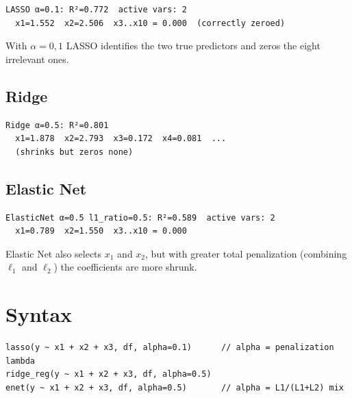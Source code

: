 \begin{lstlisting}[language={}, basicstyle=\ttfamily\small,
  frame=none, numbers=none, backgroundcolor=\color{codbg},
  xleftmargin=0pt, xrightmargin=0pt, breaklines=false]
LASSO α=0.1: R²=0.772  active vars: 2
  x1=1.552  x2=2.506  x3..x10 = 0.000  (correctly zeroed)
\end{lstlisting}

With $\alpha = 0{,}1$ LASSO identifies the two true predictors and
zeros the eight irrelevant ones.

\subsection*{Ridge}

\begin{lstlisting}[language={}, basicstyle=\ttfamily\small,
  frame=none, numbers=none, backgroundcolor=\color{codbg},
  xleftmargin=0pt, xrightmargin=0pt, breaklines=false]
Ridge α=0.5: R²=0.801
  x1=1.878  x2=2.793  x3=0.172  x4=0.081  ...
  (shrinks but zeros none)
\end{lstlisting}

\subsection*{Elastic Net}

\begin{lstlisting}[language={}, basicstyle=\ttfamily\small,
  frame=none, numbers=none, backgroundcolor=\color{codbg},
  xleftmargin=0pt, xrightmargin=0pt, breaklines=false]
ElasticNet α=0.5 l1_ratio=0.5: R²=0.589  active vars: 2
  x1=0.789  x2=1.550  x3..x10 = 0.000
\end{lstlisting}

Elastic Net also selects $x_1$ and $x_2$, but with greater total penalization
(combining $\ell_1$ and $\ell_2$) the coefficients are more shrunk.

\section{Syntax}

\begin{lstlisting}
lasso(y ~ x1 + x2 + x3, df, alpha=0.1)      // alpha = penalization lambda
ridge_reg(y ~ x1 + x2 + x3, df, alpha=0.5)
enet(y ~ x1 + x2 + x3, df, alpha=0.5)       // alpha = L1/(L1+L2) mix
\end{lstlisting}

